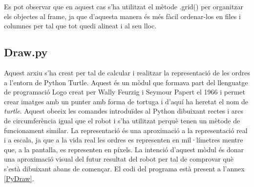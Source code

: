 Es pot observar que en aquest cas s’ha utilitzat el mètode .grid() per organitzar els objectes al frame, ja que d’aquesta manera és més fàcil ordenar-los en files i columnes per tal que tot quedi alineat i al seu lloc.

\subsection{Draw.py} \label{sec:Draw}

Aquest arxiu s’ha creat per tal de calcular i realitzar la representació de les ordres a l’entorn de Python Turtle. Aquest és un mòdul que formava part del llenguatge de programació Logo creat per Wally Feurzig i Seymour Papert el 1966 i permet crear imatges amb un punter amb forma de tortuga i d’aquí ha heretat el nom de \emph{turtle}. Aquest obeeix les comandes introduïdes al Python dibuixant rectes i arcs de circumferència igual que el robot i s’ha utilitzat perquè tenen un mètode de funcionament similar. La representació és una aproximació a la representació real i a escala, ja que a la vida real les ordres es representen en mil·límetres mentre que, a la pantalla, es representen en píxels. La intenció d’aquest mòdul és donar una aproximació visual del futur resultat del robot per tal de comprovar què s’està dibuixant abans de començar. El codi del programa està present a l'annex \ref{PyDraw}. 

